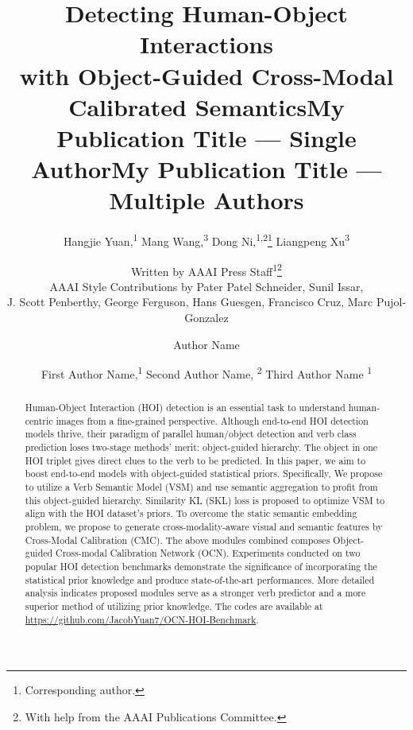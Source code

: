 \documentclass[letterpaper]{article} %
\title{Detecting Human-Object Interactions \\ with Object-Guided Cross-Modal Calibrated Semantics}
\author{
    Hangjie Yuan,\textsuperscript{\rm 1}
    Mang Wang,\textsuperscript{\rm 3}
    Dong Ni,\textsuperscript{\rm 1,2}\thanks{Corresponding author.}
    Liangpeng Xu\textsuperscript{\rm 3}\\}
\author{
    Written by AAAI Press Staff\textsuperscript{\rm 1}\thanks{With help from the AAAI Publications Committee.}\\
    AAAI Style Contributions by Pater Patel Schneider,
    Sunil Issar,\\
    J. Scott Penberthy,
    George Ferguson,
    Hans Guesgen,
    Francisco Cruz\equalcontrib,
    Marc Pujol-Gonzalez\equalcontrib
}
\title{My Publication Title --- Single Author}
\author {
    Author Name
}
\title{My Publication Title --- Multiple Authors}
\author {
    First Author Name,\textsuperscript{\rm 1}
    Second Author Name, \textsuperscript{\rm 2}
    Third Author Name \textsuperscript{\rm 1}
}
\begin{document}
\maketitle

\begin{abstract}
    Human-Object Interaction (HOI) detection is an essential task to understand human-centric images from a fine-grained perspective. Although end-to-end HOI detection models thrive, their paradigm of parallel human/object detection and verb class prediction loses two-stage methods' merit: object-guided hierarchy. The object in one HOI triplet gives direct clues to the verb to be predicted. In this paper, we aim to boost end-to-end models with object-guided statistical priors. Specifically, We propose to utilize a Verb Semantic Model (VSM) and use semantic aggregation to profit from this object-guided hierarchy. Similarity KL (SKL) loss is proposed to optimize VSM to align with the HOI dataset's priors. To overcome the static semantic embedding problem, we propose to generate cross-modality-aware visual and semantic features by Cross-Modal Calibration (CMC). The above modules combined composes Object-guided Cross-modal Calibration Network (OCN). Experiments conducted on two popular HOI detection benchmarks demonstrate the significance of incorporating the statistical prior knowledge and produce state-of-the-art performances. More detailed analysis indicates proposed modules serve as a stronger verb predictor and a more superior method of utilizing prior knowledge. The codes are available at \url{https://github.com/JacobYuan7/OCN-HOI-Benchmark}.
    
    

\end{abstract}
\end{document}
